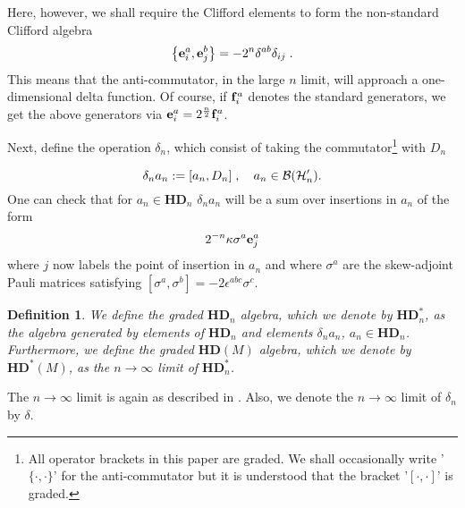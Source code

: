 \documentclass[12pt]{article}
\def\d{\delta}
\def\e{\epsilon}
\def\cb{{\cal B}}
\def\ch{{\cal H}}
\newtheorem{definition}[thm]{Definition}
\begin{document}
Here, however,  we shall require the Clifford elements to form the non-standard Clifford algebra
\begin{equation}
\left\{ {\bf e}_i^a, {\bf e}_j^b   \right\} =  -2^{n}  \d^{ab}  \d_{ij}\;.
\label{Cliff}
\end{equation}
This means that the anti-commutator, in the large $n$ limit, will approach a one-dimensional delta function. Of course, if ${\bf f}_i^a$ denotes the standard generators, we get the above generators via $ {\bf e}_i^a=2^{\frac{n}{2}}{\bf f}_i^a$.



Next, define the operation $\d_n$, which consist of taking the commutator\footnote{All operator brackets in this paper are graded. We shall occasionally write '$\{\cdot,\cdot\}$' for the anti-commutator but it is understood that the bracket '$[\cdot,\cdot]$' is graded.} with $D_n$

$$
\d_n a_n := [a_n, D_n]\;,\quad a_n\in \cb(\ch'_n).
$$
One can check that for $a_n\in\mathbf{HD}_{n}$ $\d_n a_n$ will be a sum over insertions in $a_n$ of the form
$$
2^{-n} \kappa \sigma^a  {\bf e}^a_j  
$$
where $j$ now labels the point of insertion in $a_n$ and where $\sigma^a$ are the skew-adjoint Pauli matrices satisfying $[\sigma^a,\sigma^b]= -2\e^{abc}\sigma^c$. 


\begin{definition}
We define the graded $\mathbf{HD}_n$ algebra, which we denote by $\mathbf{HD}^*_n$, as the algebra generated by elements of $\mathbf{HD}_n$ and elements  $\d_n a_n$, $a_n\in \mathbf{HD}_n$. Furthermore, we define the graded $\mathbf{HD}(M)$ algebra, which we denote by $\mathbf{HD}^*(M)$, as the $n\rightarrow\infty$ limit of $\mathbf{HD}^*_n$.
 \end{definition}
 The $n\rightarrow\infty$ limit is again as described in \cite{Aastrup:2012vq}. Also, we denote the $n\rightarrow\infty$ limit of $\d_n$ by $\d$.\\ %


\end{document}
